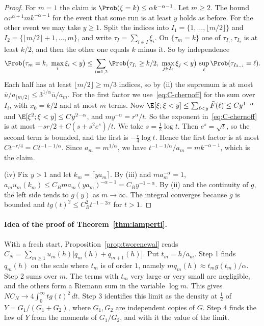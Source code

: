 \begin{proof}
For $m=1$ the claim is $\Prob(\xi=k)\le\alpha k^{-\alpha-1}$. Let $m\ge2$. The bound
$\alpha r^{\alpha+1}mk^{-\alpha-1}$ for the event that some run is at least $y$ holds as
before. For the other event we may take $y\ge1$. Split the indices into
$I_1=\{1,\dots,\lfloor m/2\rfloor\}$ and $I_2=\{\lfloor m/2\rfloor+1,\dots,m\}$, and
write $\tau_I=\sum_{i\in I}\xi_i$. On $\{\tau_m=k\}$ one of $\tau_{I_1},\tau_{I_2}$ is at
least $k/2$, and then the other one equals $k$ minus it. So by independence
\[
\Prob\bigl(\tau_m=k,\ \max_i\xi_i<y\bigr)\le\sum_{i=1,2}
\Prob\bigl(\tau_{I_i}\ge k/2,\ \max_{j\in I_i}\xi_j<y\bigr)\,\sup_\ell\Prob(\tau_{I_{3-i}}=\ell).
\]
Each half has at least $\lfloor m/2\rfloor\ge m/3$ indices, so by (ii) the supremum is at
most $\bar u/a_{\lfloor m/2\rfloor}\le3^{1/\alpha}\bar u/a_m$. For the first factor we
use~\eqref{eq:C-chernoff} for the sum over $I_i$, with $x_0=k/2$ and at most $m$ terms.
Now $\E[\xi;\xi<y]\le\sum_{\ell<y}\bar F(\ell)\le Cy^{1-\alpha}$ and
$\E[\xi^2;\xi<y]\le Cy^{2-\alpha}$, and $my^{-\alpha}=r^\alpha/t$. So the exponent
in~\eqref{eq:C-chernoff} is at most $-sr/2+C(s+s^2e^s)/t$. We take $s=\frac12\log t$.
Then $e^s=\sqrt t$, so the second term is bounded, and the first is $-\frac r4\log t$.
Hence the first factor is at most $Ct^{-r/4}=Ct^{-1-1/\alpha}$. Since $a_m=m^{1/\alpha}$,
we have $t^{-1-1/\alpha}/a_m=mk^{-\alpha-1}$, which is the claim.

(iv) Fix $y>1$ and let $k_m=\lceil ya_m\rceil$. By (iii) and $ma_m^{-\alpha}=1$,
$a_mu_m(k_m)\le C_Bma_m(ya_m)^{-\alpha-1}=C_By^{-1-\alpha}$. By (ii) and the continuity
of $g$, the left side tends to $g(y)$ as $m\to\infty$. The integral converges because
$g$ is bounded and $tg(t)^2\le C_B^2t^{-1-2\alpha}$ for $t>1$.
\end{proof}

\paragraph{Idea of the proof of Theorem~\ref{thm:lamperti}.}
With a fresh start, Proposition~\ref{prop:tworenewal} reads
$C_N=\sum_{m\ge1}u_m(h)\bigl[q_m(h)+q_{m+1}(h)\bigr]$. Put $t_m=h/a_m$. Step 1 finds
$q_m(h)$ on the scale where $t_m$ is of order $1$, namely $mq_m(h)\approx t_mg(t_m)/\alpha$.
Step 2 sums over $m$. The terms with $t_m$ very large or very small are negligible, and
the others form a Riemann sum in the variable $\log m$. This gives
$NC_N\to4\int_0^\infty tg(t)^2\,dt$. Step 3 identifies this limit as the density at
$\frac12$ of $Y=G_1/(G_1+G_2)$, where $G_1,G_2$ are independent copies of $G$. Step 4
finds the law of $Y$ from the moments of $G_1/G_2$, and with it the value of the limit.

